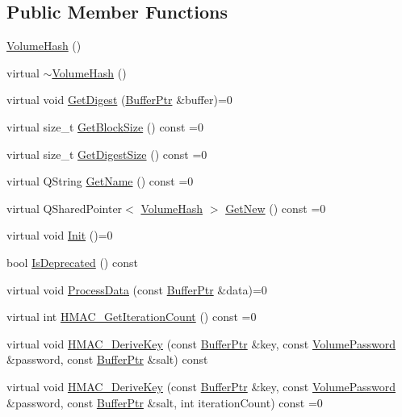 \subsection*{Public Member Functions}
\begin{DoxyCompactItemize}
\item 
\hyperlink{class_gost_crypt_1_1_volume_1_1_volume_hash_a1eaccd0c91cb630b64b14e1e8ad2a455}{Volume\+Hash} ()
\item 
virtual \hyperlink{class_gost_crypt_1_1_volume_1_1_volume_hash_a7340fccb9bd63c44a1249dfa227b417e}{$\sim$\+Volume\+Hash} ()
\item 
virtual void \hyperlink{class_gost_crypt_1_1_volume_1_1_volume_hash_a8ae75f9cc4beea8ecb8751ecb221c797}{Get\+Digest} (\hyperlink{class_gost_crypt_1_1_buffer_ptr}{Buffer\+Ptr} \&buffer)=0
\item 
virtual size\+\_\+t \hyperlink{class_gost_crypt_1_1_volume_1_1_volume_hash_afa3e93a57c887289134901df48b9bced}{Get\+Block\+Size} () const =0
\item 
virtual size\+\_\+t \hyperlink{class_gost_crypt_1_1_volume_1_1_volume_hash_a3677448f436ac856778274dafdc36ed4}{Get\+Digest\+Size} () const =0
\item 
virtual Q\+String \hyperlink{class_gost_crypt_1_1_volume_1_1_volume_hash_ac6a1fa9550857b211a304c305a526355}{Get\+Name} () const =0
\item 
virtual Q\+Shared\+Pointer$<$ \hyperlink{class_gost_crypt_1_1_volume_1_1_volume_hash}{Volume\+Hash} $>$ \hyperlink{class_gost_crypt_1_1_volume_1_1_volume_hash_a4da6870eedb23e17cf26923478478fa6}{Get\+New} () const =0
\item 
virtual void \hyperlink{class_gost_crypt_1_1_volume_1_1_volume_hash_a7167d7316a705369d8bc4e1cc5f2e61e}{Init} ()=0
\item 
bool \hyperlink{class_gost_crypt_1_1_volume_1_1_volume_hash_a1ac3c5f22767ea53437c684148aad0cb}{Is\+Deprecated} () const
\item 
virtual void \hyperlink{class_gost_crypt_1_1_volume_1_1_volume_hash_a58c69a4ea5a247454bd6b4dd6c736ecd}{Process\+Data} (const \hyperlink{class_gost_crypt_1_1_buffer_ptr}{Buffer\+Ptr} \&data)=0
\item 
virtual int \hyperlink{class_gost_crypt_1_1_volume_1_1_volume_hash_a7f565609ef9bd178423575603b252d33}{H\+M\+A\+C\+\_\+\+Get\+Iteration\+Count} () const =0
\item 
virtual void \hyperlink{class_gost_crypt_1_1_volume_1_1_volume_hash_a7a75b6a482e6876994834de0319bc0d5}{H\+M\+A\+C\+\_\+\+Derive\+Key} (const \hyperlink{class_gost_crypt_1_1_buffer_ptr}{Buffer\+Ptr} \&key, const \hyperlink{class_gost_crypt_1_1_volume_1_1_volume_password}{Volume\+Password} \&password, const \hyperlink{class_gost_crypt_1_1_buffer_ptr}{Buffer\+Ptr} \&salt) const
\item 
virtual void \hyperlink{class_gost_crypt_1_1_volume_1_1_volume_hash_a6804d6896491ea8c0a7be6600b6d7113}{H\+M\+A\+C\+\_\+\+Derive\+Key} (const \hyperlink{class_gost_crypt_1_1_buffer_ptr}{Buffer\+Ptr} \&key, const \hyperlink{class_gost_crypt_1_1_volume_1_1_volume_password}{Volume\+Password} \&password, const \hyperlink{class_gost_crypt_1_1_buffer_ptr}{Buffer\+Ptr} \&salt, int iteration\+Count) const =0
\end{DoxyCompactItemize}
